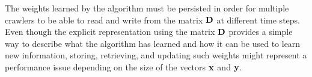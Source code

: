 The weights learned by the \mlblink algorithm must be persisted in order for multiple crawlers to be able to read and write from the matrix $\boldsymbol{\mathbf{D}}$ at different time steps. Even though the explicit representation using the matrix $\boldsymbol{\mathbf{D}}$ provides a simple way to describe what the algorithm has learned and how it can be used to learn new information, storing, retrieving, and updating such weights might represent a performance issue depending on the size of the vectors $\boldsymbol{\mathbf{x}}$ and $\boldsymbol{\mathbf{y}}$.